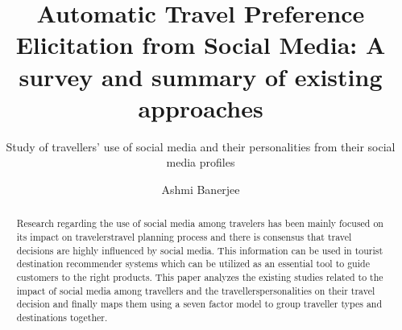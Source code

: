 \documentclass[sigconf]{acmart}
\begin{document}
\title{Automatic Travel Preference Elicitation from Social Media: A survey and summary of existing approaches}
\subtitle{Study of travellers' use of social media and their personalities from their social media profiles}

\author{Ashmi Banerjee}

\renewcommand{\shortauthors}{Ashmi Banerjee}


\begin{abstract}
Research regarding the use of social media among travelers has been mainly focused on its impact on travelers\textquotesingle travel planning process and there is consensus that travel decisions are highly influenced by social media. This information can be used in tourist destination recommender systems which can be utilized as an essential tool to guide customers to the right products. This paper analyzes the existing studies related to the impact of social media among travellers and the travellers\textquotesingle personalities on their travel decision and finally maps them using a seven factor model to group traveller types and destinations together.


\end{abstract}


\maketitle






\end{document}
